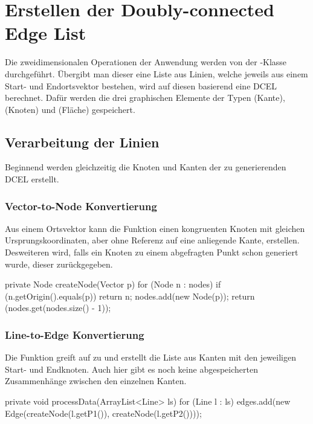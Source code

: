 \section{Erstellen der Doubly-connected Edge List}
Die zweidimensionalen Operationen der Anwendung werden von der -Klasse durchgeführt. 
Übergibt man dieser eine Liste aus Linien, welche jeweils aus einem Start- und Endortsvektor bestehen, wird auf diesen basierend eine DCEL berechnet.
Dafür werden die drei graphischen Elemente der Typen  (Kante),  (Knoten) und  (Fläche) gespeichert.

\subsection{Verarbeitung der Linien}
Beginnend werden gleichzeitig die Knoten und Kanten der zu generierenden DCEL erstellt.
\subsubsection{Vector-to-Node Konvertierung}
Aus einem Ortsvektor kann die Funktion  einen kongruenten Knoten mit gleichen Ursprungskoordinaten, aber ohne Referenz auf eine anliegende Kante, erstellen. 
Desweiteren wird, falls ein Knoten zu einem abgefragten Punkt schon generiert wurde, dieser zurückgegeben. \\

\begin{code}
	private Node createNode(Vector p) {
		for (Node n : nodes) {
			if (n.getOrigin().equals(p)) {
				return n;
			}
		}
		nodes.add(new Node(p));
		return (nodes.get(nodes.size() - 1));
	}
\end{code}

\subsubsection{Line-to-Edge Konvertierung}
\label{subsec:ltoe} 
Die  Funktion greift auf  zu und erstellt die Liste aus Kanten mit den jeweiligen Start- und Endknoten.
Auch hier gibt es noch keine abgespeicherten Zusammenhänge zwischen den einzelnen Kanten. \\

\begin{code}
	private void processData(ArrayList<Line> ls) {
		for (Line l : ls) {
			edges.add(new Edge(createNode(l.getP1()), createNode(l.getP2())));
		}
	}
\end{code}

